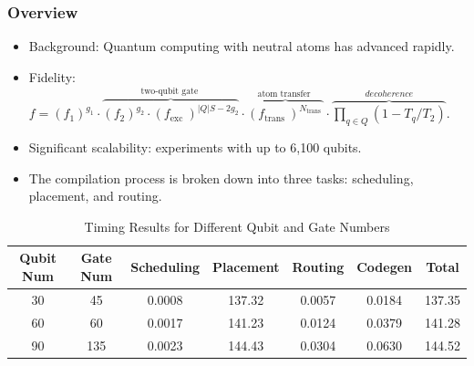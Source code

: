 \documentclass[18 pt]{beamer}
\begin{document}
\begin{frame}
    \frametitle{Overview}
    \begin{itemize}
        \item Background: Quantum computing with neutral atoms has advanced rapidly.
        \item Fidelity: \(f=\left(f_{1}\right)^{g_{1}} \cdot \overbrace{\left(f_{2}\right)^{g_{2}} \cdot\left(f_{\text {exc }}\right)^{|Q| S-2 g_{2}}}^{\text {two-qubit gate }} \cdot \overbrace{\left(f_{\text {trans }}\right)^{N_{\text {trans }}}}^{\text {atom transfer }}\cdot \overbrace{\prod_{q\in Q} (1-T_q/T_2)}^{decoherence}\).
        \item Significant scalability: experiments with up to 6,100 qubits.
        \item The compilation process is broken down into three tasks: scheduling, placement, and routing.
    \end{itemize}
    \begin{table}[h!]
        \centering
        \tiny
        \begin{tabular}{|c|c|c|c|c|c|c|}
        \hline
        \textbf{Qubit Num} & \textbf{Gate Num} & \textbf{Scheduling} & \textbf{Placement} & \textbf{Routing} & \textbf{Codegen} & \textbf{Total} \\
        \hline
        30 & 45 & 0.0008 & 137.32 & 0.0057 & 0.0184 & 137.35 \\
        \hline
        60 & 60 & 0.0017 & 141.23 & 0.0124 & 0.0379 & 141.28 \\
        \hline
        90 & 135 & 0.0023 & 144.43 & 0.0304 & 0.0630 & 144.52 \\
        \hline
        \end{tabular}
        \caption{Timing Results for Different Qubit and Gate Numbers}
        \label{table:timing_results}
    \end{table}
\end{frame}
\end{document}
